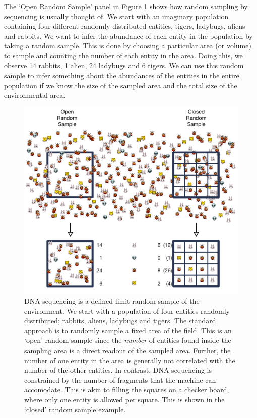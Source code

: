 \documentclass[onecolumn]{book}
\theoremstyle{definition}
\theoremstyle{definition}
\theoremstyle{definition}
\theoremstyle{remark}
\begin{document}
The `Open Random Sample' panel in Figure \ref{RALT} shows how random
sampling by sequencing is usually thought of. We start with an imaginary
population containing four different randomly distributed entities,
tigers, ladybugs, aliens and rabbits. We want to infer the abundance of
each entity in the population by taking a random sample. This is done by
choosing a particular area (or volume) to sample and counting the number
of each entity in the area. Doing this, we observe 14 rabbits, 1 alien,
24 ladybugs and 6 tigers. We can use this random sample to infer
something about the abundances of the entities in the entire population
if we know the size of the sampled area and the total size of the
environmental area.

\begin{figure}
\centering
\includegraphics{figs/RALT.pdf}
\caption{\label{RALT} DNA sequencing is a defined-limit random sample of
the environment. We start with a population of four entities randomly
distributed; rabbits, aliens, ladybugs and tigers. The standard approach
is to randomly sample a fixed area of the field. This is an `open'
random sample since the \emph{number} of entities found inside the
sampling area is a direct readout of the sampled area. Further, the
number of one entity in the area is generally not correlated with the
number of the other entities. In contrast, DNA sequencing is constrained
by the number of fragments that the machine can accomodate. This is akin
to filling the squares on a checker board, where only one entity is
allowed per square. This is shown in the `closed' random sample
example.}
\end{figure}
\end{document}
